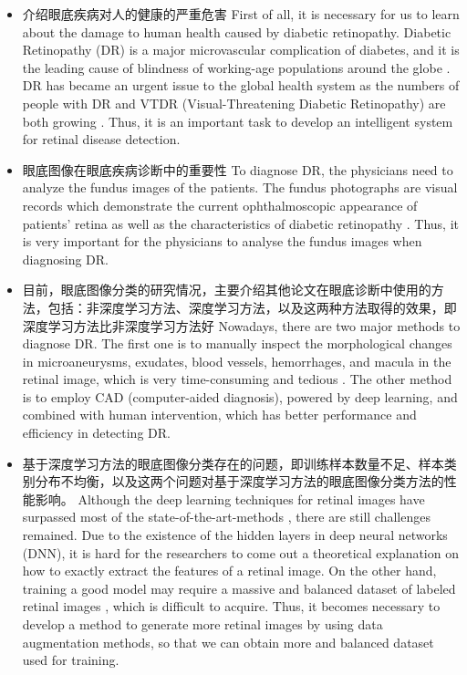 \documentclass{ijisa}
\begin{document}
\begin{itemize}
    \item 介绍眼底疾病对人的健康的严重危害
    First of all, it is necessary for us to learn about the damage to human health caused by diabetic retinopathy. Diabetic Retinopathy (DR) is a major microvascular complication of  diabetes, and it is the leading cause of blindness of working-age populations around the globe \cite{zheng2012worldwide}. DR has became an urgent issue to the global health system as the numbers of people with DR and VTDR (Visual-Threatening Diabetic Retinopathy) are both growing \cite{zheng2012worldwide}. Thus, it is an important task to develop an intelligent system for retinal disease detection. 
    
    \item 眼底图像在眼底疾病诊断中的重要性
    To diagnose DR, the physicians need to analyze the fundus images of the patients. The fundus photographs are visual records which demonstrate the current ophthalmoscopic appearance of patients' retina as well as the characteristics of diabetic retinopathy \cite{shankle2004ophthalmic}. Thus, it is very important for the physicians to analyse the fundus images when diagnosing DR.
    \item 目前，眼底图像分类的研究情况，主要介绍其他论文在眼底诊断中使用的方法，包括：非深度学习方法、深度学习方法，以及这两种方法取得的效果，即深度学习方法比非深度学习方法好
    Nowadays, there are two major methods to diagnose DR. The first one is to manually inspect the morphological changes in microaneurysms, exudates, blood vessels, hemorrhages, and macula in the retinal image, which is very time-consuming and tedious \cite{amin2016review}. The other method is to employ CAD (computer-aided diagnosis), powered by deep learning, and combined with human intervention, which has better performance and efficiency in detecting DR.
    \item 基于深度学习方法的眼底图像分类存在的问题，即训练样本数量不足、样本类别分布不均衡，以及这两个问题对基于深度学习方法的眼底图像分类方法的性能影响。
    Although the deep learning techniques for retinal images have surpassed  most of the state-of-the-art-methods \cite{badar2020application}, there are still challenges remained. Due to the existence of the hidden layers in deep neural networks (DNN), it is hard for the researchers to come out a theoretical explanation on how to exactly extract the features of a retinal image. On the other hand, training a good model may require a massive and  balanced dataset of labeled retinal images \cite{badar2020application}, which is difficult to acquire. Thus, it becomes necessary to develop a method to generate more retinal images by using data augmentation methods, so that we can obtain more and balanced dataset used for training.
\end{itemize}
\end{document}
